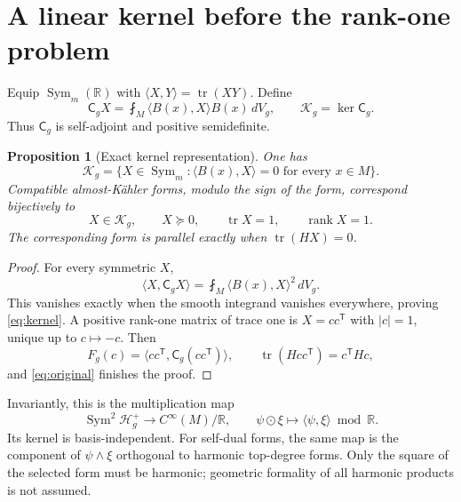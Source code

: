\documentclass[11pt]{article}
\newtheorem{proposition}{Proposition}[section]
\theoremstyle{remark}\newtheorem{remark}[proposition]{Remark}
\newcommand{\Sym}{\operatorname{Sym}}
\newcommand{\tr}{\operatorname{tr}}
\newcommand{\rank}{\operatorname{rank}}
\newcommand{\av}{\mathop{\fint}\nolimits}
\newcommand{\HH}{\mathcal H_g^+}
\newcommand{\KK}{\mathcal K_g}
\newcommand{\CC}{\mathsf C_g}
\begin{document}
\section{A linear kernel before the rank-one problem}
Equip $\Sym_m(\mathbb R)$ with $\langle X,Y\rangle=\tr(XY)$. Define
\begin{equation}
 \CC X=\av_M\langle B(x),X\rangle B(x)\,dV_g,
 \qquad \KK=\ker\CC.
 \label{eq:C}
\end{equation}
Thus $\CC$ is self-adjoint and positive semidefinite.

\begin{proposition}[Exact kernel representation]
One has
\begin{equation}
 \KK=\{X\in\Sym_m:\langle B(x),X\rangle=0\text{ for every }x\in M\}.
 \label{eq:kernel}
\end{equation}
Compatible almost-K\"ahler forms, modulo the sign of the form, correspond bijectively to
\begin{equation}
 X\in\KK,\qquad X\succeq0,\qquad \tr X=1,\qquad\rank X=1.
 \label{eq:rankone}
\end{equation}
The corresponding form is parallel exactly when $\tr(HX)=0$.
\end{proposition}
\begin{proof}
For every symmetric $X$,
\[
 \langle X,\CC X\rangle=\av_M\langle B(x),X\rangle^2\,dV_g.
\]
This vanishes exactly when the smooth integrand vanishes everywhere, proving \eqref{eq:kernel}. A positive rank-one matrix of trace one is $X=cc^{\mathsf T}$ with $|c|=1$, unique up to $c\mapsto-c$. Then
\[
 F_g(c)=\langle cc^{\mathsf T},\CC(cc^{\mathsf T})\rangle,
 \qquad\tr(Hcc^{\mathsf T})=c^{\mathsf T}Hc,
\]
and \eqref{eq:original} finishes the proof.
\end{proof}

Invariantly, this is the multiplication map
\[
 \Sym^2\HH\longrightarrow C^\infty(M)/\mathbb R,
 \qquad \psi\odot\xi\longmapsto\langle\psi,\xi\rangle\bmod\mathbb R.
\]
Its kernel is basis-independent. For self-dual forms, the same map is the component of $\psi\wedge\xi$ orthogonal to harmonic top-degree forms. Only the square of the selected form must be harmonic; geometric formality of all harmonic products is not assumed.
\end{document}
